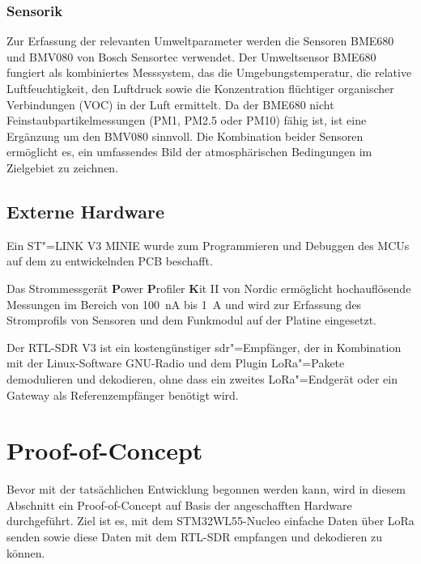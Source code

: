 \subsubsection{Sensorik}

Zur Erfassung der relevanten Umweltparameter werden die Sensoren BME680 und BMV080 von 
Bosch Sensortec verwendet. Der Umweltsensor BME680 fungiert als kombiniertes Messsystem, das die Umgebungstemperatur, 
die relative Luftfeuchtigkeit, den Luftdruck sowie die Konzentration flüchtiger organischer Verbindungen (VOC) 
in der Luft ermittelt. Da der BME680 nicht Feinstaubpartikelmessungen (PM1, PM2.5 oder PM10) fähig ist, ist eine
Ergänzung um den BMV080 sinnvoll. Die Kombination beider Sensoren ermöglicht es, ein umfassendes Bild der atmosphärischen 
Bedingungen im Zielgebiet zu zeichnen. 

\subsection{Externe Hardware}

\begin{description}[leftmargin=*, widest=\textbf{RTL-SDR V3}, nosep]
    \item[\textbf{ST-LINK}:] 
        Ein ST"=LINK V3 MINIE wurde zum Programmieren und Debuggen des MCUs auf dem zu entwickelnden PCB beschafft.
    \item[\textbf{PPK2}:] 
        Das Strommessgerät \textbf{P}ower \textbf{P}rofiler \textbf{K}it II von Nordic ermöglicht    
        hochauflösende Messungen im Bereich von \qty{100}{\nano\ampere} bis \qty{1}{\ampere} und wird zur Erfassung 
        des Stromprofils von Sensoren und dem Funkmodul auf der Platine eingesetzt. 
    \item[\textbf{RTL-SDR V3}:] 
        Der RTL-SDR V3 ist ein kostengünstiger \acrfull{sdr}"=Empfänger, der in Kombination mit der Linux-Software
        GNU-Radio und dem Plugin  LoRa"=Pakete demodulieren und dekodieren, ohne dass ein zweites
        LoRa"=Endgerät oder ein Gateway als Referenzempfänger benötigt wird.
\end{description}

\section{Proof-of-Concept} 

Bevor mit der tatsächlichen Entwicklung begonnen werden kann, wird in diesem Abschnitt ein Proof-of-Concept
auf Basis der angeschafften Hardware durchgeführt. Ziel ist es, mit dem STM32WL55-Nucleo einfache Daten
über LoRa senden sowie diese Daten mit dem RTL-SDR empfangen und dekodieren zu können. 

